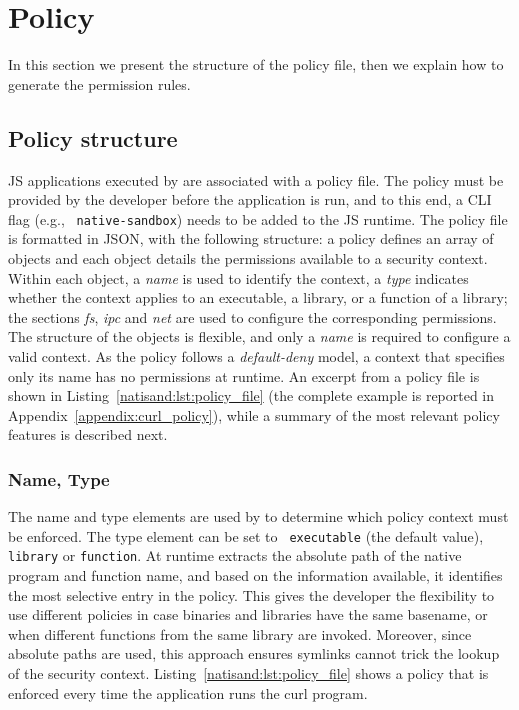 \section{Policy}
\label{natisand:sect:policy}

In this section we present the structure of the policy file, then we
explain how to generate the permission rules.

\subsection{Policy structure}
\label{sect:sci-ffi-policy-structure}

JS applications executed by \natisand are associated with a policy
file. The policy must be provided by the developer before the
application is run, and to this end, a CLI flag (e.g., {\tt
  native-sandbox}) needs to be added to the JS runtime. The policy
file is formatted in JSON, with the following structure: a policy
defines an array of objects and each object details the permissions
available to a security context.  Within each object, a {\em name} is
used to identify the context, a {\em type} indicates whether the
context applies to an executable, a library, or a function of a
library; the sections {\em fs}, {\em ipc} and {\em net} are used to
configure the corresponding permissions. The structure of the objects
is flexible, and only a {\em name} is required to configure a valid
context. As the policy follows a {\em default-deny} model, a context
that specifies only its name has no permissions at runtime. An excerpt
from a policy file is shown in Listing~\ref{natisand:lst:policy_file} (the
complete example is reported in Appendix~\ref{appendix:curl_policy}),
while a summary of the most relevant policy features is described
next.

\subsubsection*{Name, Type}

The name and type elements are used by \natisand to determine which policy
context must be enforced. The type element can be set to {\tt
  executable} (the default value), {\tt library} or {\tt function}.
At runtime \natisand extracts the absolute path of the native program and function
name, and based on the information available, it identifies the most
selective entry in the policy. This gives the developer the
flexibility to use different policies in case binaries and libraries
have the same basename, or when different functions
from the same library are invoked. Moreover, since absolute
paths are used, this approach ensures symlinks cannot trick the lookup
of the security context. Listing~\ref{natisand:lst:policy_file} shows
a policy that is enforced every time the application runs the curl
program.

